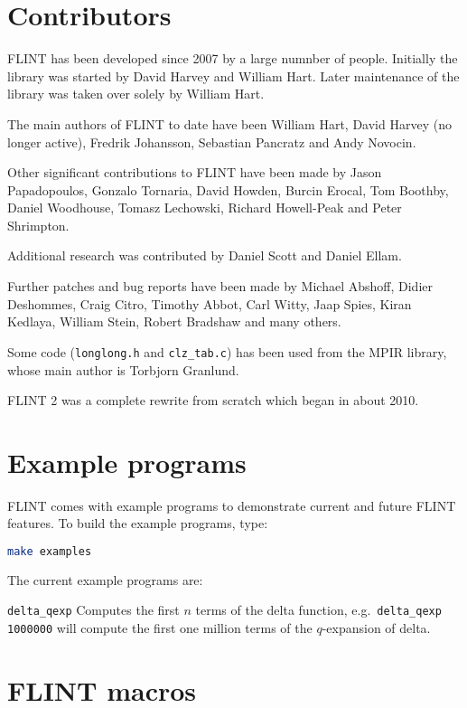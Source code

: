 \documentclass[a4paper,10pt]{book}
\newcommand{\code}{\lstinline}
\begin{document}
\chapter{Contributors}

FLINT has been developed since 2007 by a large numnber of people. Initially
the library was started by David Harvey and William Hart. Later maintenance
of the library was taken over solely by William Hart.

The main authors of FLINT to date have been William Hart, David Harvey (no
longer active), Fredrik Johansson, Sebastian Pancratz and Andy Novocin.

Other significant contributions to FLINT have been made by Jason Papadopoulos,
Gonzalo Tornaria, David Howden, Burcin Erocal, Tom Boothby, Daniel Woodhouse, 
Tomasz Lechowski, Richard Howell-Peak and Peter Shrimpton.

Additional research was contributed by Daniel Scott and Daniel Ellam.

Further patches and bug reports have been made by Michael Abshoff, Didier 
Deshommes, Craig Citro, Timothy Abbot, Carl Witty, Jaap Spies, Kiran 
Kedlaya, William Stein, Robert Bradshaw and many others.

Some code (\code{longlong.h} and \code{clz_tab.c}) has been used from 
the MPIR library, whose main author is Torbjorn Granlund.

FLINT 2 was a complete rewrite from scratch which began in about 2010.
 
\chapter{Example programs}

FLINT comes with example programs to demonstrate current and future FLINT 
features.  To build the example programs, type:

\begin{lstlisting}[language=bash]
make examples
\end{lstlisting}

The current example programs are:

\code{delta_qexp}  Computes the first $n$ terms of the delta function, e.g.\ 
\code{delta_qexp 1000000} will compute the first one million terms of the 
$q$-expansion of delta.

\chapter{FLINT macros}
\end{document}
